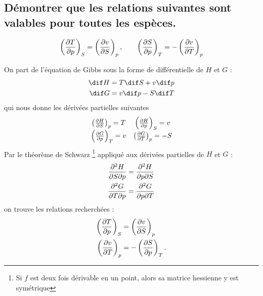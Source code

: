 \subsection{Démontrer que les relations suivantes sont valables pour toutes les espèces.}
\[ \left(\pdv{T}{p}\right)_{S} = \left(\pdv{v}{S}\right)_{p}, \qquad
	\left(\pdv{S}{p}\right)_{T} = -\left(\pdv{v}{T}\right)_{p} \]

On part de l'équation de Gibbs sous la forme de différentielle de $H$ et $G$ :
\begin{align*}
	\dif H &= T \dif S + v \dif p \\
	\dif G &= v \dif p - S \dif T
\end{align*}
qui nous donne les dérivées partielles suivantes
\[ \begin{matrix}
	\left(\pdv{H}{S}\right)_{p} = T & \left(\pdv{H}{p}\right)_{S} = v \\
	\left(\pdv{G}{p}\right)_{T} = v & \left(\pdv{G}{T}\right)_{p} = -S
\end{matrix} \]
Par le théorème de Schwarz
\footnote{Si $f$ est deux fois dérivable en un point, alors sa matrice hessienne y est symétrique}
appliqué aux dérivées partielles de $H$ et $G$ :
\begin{align*}
	\pdv{H}{S}{p} &= \pdv{H}{p}{S} \\
	\pdv{G}{T}{p} &= \pdv{G}{p}{T}
\end{align*}
on trouve les relations recherchées :
\begin{align}
	\left(\pdv{T}{p}\right)_{S} &= \left(\pdv{v}{S}\right)_{p} \notag \\
	\left(\pdv{v}{T}\right)_{p} &= -\left(\pdv{S}{p}\right)_{T}.
\end{align}

